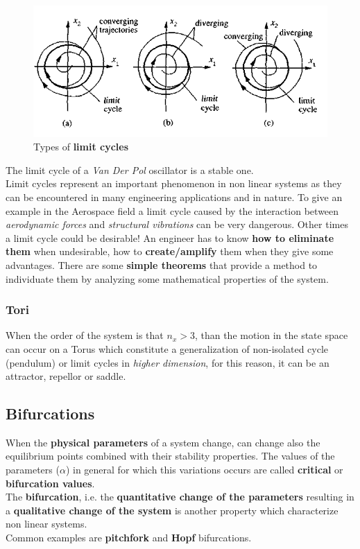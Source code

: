 \begin{figure}[h]
    \centering
    \includegraphics[scale=0.7]{NonLinearControl/images/limitcycles.png}
    \caption{Types of \textbf{limit cycles}}
    \label{fig:enter-label}
\end{figure}
The limit cycle of a \textit{Van Der Pol} oscillator is a stable one.\\
Limit cycles represent an important phenomenon in non linear systems as they can be encountered in many engineering applications and in nature. To give an example in the Aerospace field a limit cycle caused by the interaction between \textit{aerodynamic forces} and \textit{structural vibrations} can be very dangerous. Other times a limit cycle could be desirable! An engineer has to know \textbf{how to eliminate them} when undesirable, how to \textbf{create/amplify} them when they give some advantages. There are some \textbf{simple theorems} that provide a method to individuate them by analyzing some mathematical properties of the system.

\subsubsection{Tori}
When the order of the system is that $n_x>3$, than the motion in the state space can occur on a Torus which constitute a generalization of non-isolated cycle (pendulum) or limit  cycles in \textit{higher dimension}, for this reason, it can be an attractor, repellor or saddle.

\subsection{Bifurcations}
When the \textbf{physical parameters} of a system change, can change also the equilibrium points combined with their stability properties. The values of the parameters ($\alpha$) in general for which this variations occurs are called \textbf{critical} or \textbf{bifurcation values}.\\
The \textbf{bifurcation}, i.e. the \textbf{quantitative change of the parameters} resulting in a \textbf{qualitative change of the system} is another property which characterize non linear systems.\\
Common examples are \textbf{pitchfork} and \textbf{Hopf} bifurcations.

